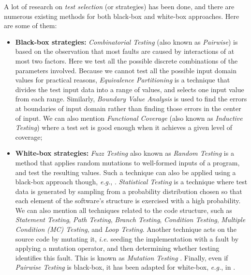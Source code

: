 A lot of research on \textit{test selection} (or strategies) has
been done, and there are numerous existing methods for both
black-box and white-box approaches. Here are some of them:

\begin{itemize}
    \item \textbf{Black-box strategies:} \emph{Combinatorial
        Testing}
        (also known as \emph{Pairwise}) \cite{Tai98atest} is based on
        the observation that most faults are caused by
        interactions of at most two factors. Here we test all the
        possible discrete combinations of the parameters
        involved.  Because we cannot test all the possible input
        domain values for practical reasons, \emph{Equivalence
        Partitioning} \cite{Huang13} is a technique that divides
        the test input data into a range of values, and selects
        one input value from each range. Similarly, \emph{Boundary
        Value Analysis} \cite{Ramachandran:2003:TSC:942796.943301}
        is used to find the errors at boundaries of input domain
        rather than finding those errors in the center of input.
        We can also mention \emph{Functional Coverage} (also known as
        \emph{Inductive Testing})
        \cite{Walkinshaw:2010:IFC:1928028.1928038} where a test
        set is good enough when it achieves a given level of
        coverage;

    \item \textbf{White-box strategies:} \emph{Fuzz Testing} also known
        as \emph{Random Testing}
        \cite{Duran:1981:RRT:800078.802530,Godefroid08automatedwhitebox}
        is a method that applies random mutations to well-formed
        inputs of a program, and test the resulting values. Such
        a technique can also be applied using a black-box
        approach though, \emph{e.g.}, \cite{5387827}.
        \emph{Statistical Testing} \cite{Walton:1995:STS:210453.210458}
        is a technique where test data is generated by sampling
        from a probability distribution chosen so that each
        element of the software's structure is exercised with a
        high probability. We can also mention all techniques
        related to the code structure, such as \emph{Statement
        Testing}, \emph{Path Testing}, \emph{Branch Testing},
        \emph{Condition Testing}, \emph{Multiple Condition (MC)
        Testing}, and \emph{Loop Testing}. Another technique acts
        on the source code by mutating it, \emph{i.e.} seeding
        the implementation with a fault by applying a mutation
        operator, and then determining whether testing identifies
        this fault. This is known as \emph{Mutation Testing}
        \cite{1702444}. Finally, even if \emph{Pairwise Testing}
        is black-box, it has been adapted for white-box,
        \emph{e.g.}, in \cite{4385509}.
\end{itemize}

